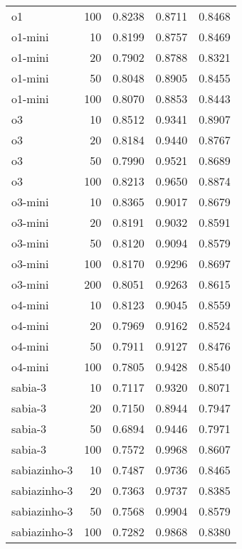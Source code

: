 \begin{tabular}{lrrrr}
o1 & 100 & 0.8238 & 0.8711 & 0.8468 \\
o1-mini & 10 & 0.8199 & 0.8757 & 0.8469 \\
o1-mini & 20 & 0.7902 & 0.8788 & 0.8321 \\
o1-mini & 50 & 0.8048 & 0.8905 & 0.8455 \\
o1-mini & 100 & 0.8070 & 0.8853 & 0.8443 \\
o3 & 10 & 0.8512 & 0.9341 & 0.8907 \\
o3 & 20 & 0.8184 & 0.9440 & 0.8767 \\
o3 & 50 & 0.7990 & 0.9521 & 0.8689 \\
o3 & 100 & 0.8213 & 0.9650 & 0.8874 \\
o3-mini & 10 & 0.8365 & 0.9017 & 0.8679 \\
o3-mini & 20 & 0.8191 & 0.9032 & 0.8591 \\
o3-mini & 50 & 0.8120 & 0.9094 & 0.8579 \\
o3-mini & 100 & 0.8170 & 0.9296 & 0.8697 \\
o3-mini & 200 & 0.8051 & 0.9263 & 0.8615 \\
o4-mini & 10 & 0.8123 & 0.9045 & 0.8559 \\
o4-mini & 20 & 0.7969 & 0.9162 & 0.8524 \\
o4-mini & 50 & 0.7911 & 0.9127 & 0.8476 \\
o4-mini & 100 & 0.7805 & 0.9428 & 0.8540 \\
sabia-3 & 10 & 0.7117 & 0.9320 & 0.8071 \\
sabia-3 & 20 & 0.7150 & 0.8944 & 0.7947 \\
sabia-3 & 50 & 0.6894 & 0.9446 & 0.7971 \\
sabia-3 & 100 & 0.7572 & 0.9968 & 0.8607 \\
sabiazinho-3 & 10 & 0.7487 & 0.9736 & 0.8465 \\
sabiazinho-3 & 20 & 0.7363 & 0.9737 & 0.8385 \\
sabiazinho-3 & 50 & 0.7568 & 0.9904 & 0.8579 \\
sabiazinho-3 & 100 & 0.7282 & 0.9868 & 0.8380 \\
\bottomrule
\end{tabular}
